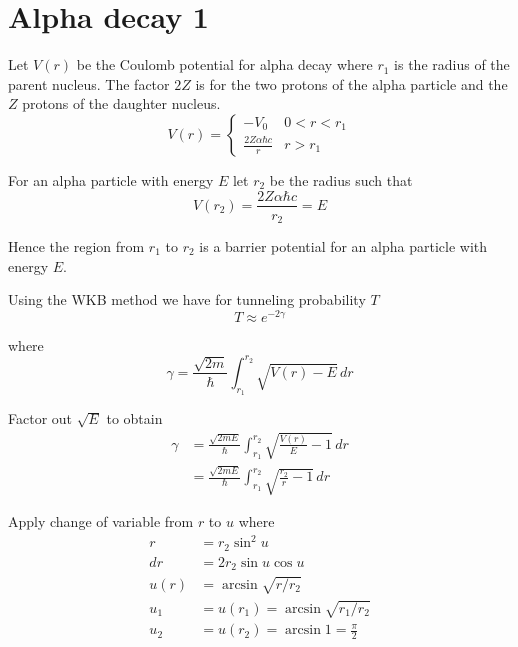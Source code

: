 





\section*{Alpha decay 1}

Let $V(r)$ be the Coulomb potential for alpha decay where $r_1$ is the radius of the parent nucleus.
The factor $2Z$ is for the two protons of the alpha particle and the $Z$ protons of the daughter nucleus.
\begin{equation*}
V(r)=\begin{cases}
-V_0 & 0<r<r_1
\\[1ex]
{\displaystyle \frac{2Z\alpha\hbar c}{r}} & r>r_1
\end{cases}
\end{equation*}

For an alpha particle with energy $E$ let $r_2$ be the radius such that
\begin{equation*}
V(r_2)=\frac{2Z\alpha\hbar c}{r_2}=E
\end{equation*}

Hence the region from $r_1$ to $r_2$ is a barrier potential for an alpha particle with energy $E$.

\bigskip
Using the WKB method we have for tunneling probability $T$
\begin{equation*}
T\approx e^{-2\gamma}
\end{equation*}

where
\begin{equation*}
\gamma=\frac{\sqrt{2m}}{\hbar}\int_{r_1}^{r_2}\sqrt{V(r)-E}\,dr
\end{equation*}

Factor out $\sqrt E$ to obtain
\begin{align*}
\gamma&=\frac{\sqrt{2mE}}{\hbar}\int_{r_1}^{r_2}\sqrt{\frac{V(r)}{E}-1}\,dr
\\[1ex]
&=\frac{\sqrt{2mE}}{\hbar}\int_{r_1}^{r_2}\sqrt{\frac{r_2}{r}-1}\,dr
\end{align*}

Apply change of variable from $r$ to $u$ where
\begin{align*}
r&=r_2\sin^2u
\\
dr&=2r_2\sin u\cos u
\\
u(r)&=\arcsin\sqrt{r/r_2}
\\
u_1&=u(r_1)=\arcsin\sqrt{r_1/r_2}
\\
u_2&=u(r_2)=\arcsin 1=\frac{\pi}{2}
\end{align*}

